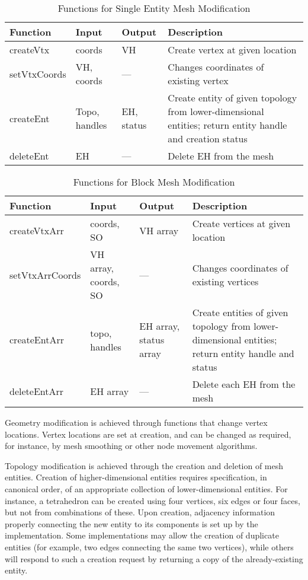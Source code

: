 \begin{table}[tbp]
\caption{Functions for Single Entity Mesh Modification}\label{table:Modify}
{\small
\begin{tabular}{|p{1.25in}|p{0.75in}|p{0.75in}|p{223pt}|}
\hline 
Function&
Input&
Output&
Description\tabularnewline
\hline
\hline 
createVtx&
coords&
VH&
Create vertex at given location\tabularnewline
\hline 
setVtxCoords&
VH, coords&
---&
Changes coordinates of existing vertex\tabularnewline
\hline 
createEnt&
Topo, handles&
EH, status&
Create entity of given topology from lower-dimensional entities; return
entity handle and creation status\tabularnewline
\hline 
deleteEnt&
EH&
---&
Delete EH from the mesh\tabularnewline
\hline
\end{tabular}
}
\end{table}
\begin{table}[tbp]
\caption{Functions for Block Mesh Modification}\label{table:ModArr}
{\small
\begin{tabular}{|p{1.25in}|p{0.75in}|p{0.75in}|p{223pt}|}
\hline 
Function&
Input&
Output&
Description\tabularnewline
\hline
\hline 
createVtxArr&
coords, SO&
VH array&
Create vertices at given location\tabularnewline
\hline 
setVtxArrCoords&
VH array, coords, SO&
---&
Changes coordinates of existing vertices\tabularnewline
\hline 
createEntArr&
topo, handles&
EH array, status array&
Create entities of given topology from lower-dimensional entities;
return entity handle and status\tabularnewline
\hline 
deleteEntArr&
EH array&
---&
Delete each EH from the mesh\tabularnewline
\hline
\end{tabular}
}
\end{table}


Geometry modification is achieved through functions that change vertex
locations.  Vertex locations are set at creation, and can be changed as
required, for instance, by mesh smoothing or other node movement
algorithms.

Topology modification is achieved through the creation and deletion of
mesh entities.  Creation of higher-dimensional entities requires
specification, in canonical order, of an appropriate collection of
lower-dimensional entities. For instance, a tetrahedron can be created
using four vertices, six edges or four faces, but not from
combinations of these. Upon creation, adjacency information properly
connecting the new entity to its components is set up by the
implementation. Some implementations may allow the creation of
duplicate entities (for example, two edges connecting the same two
vertices), while others will respond to such a creation request by
returning a copy of the already-existing entity.

